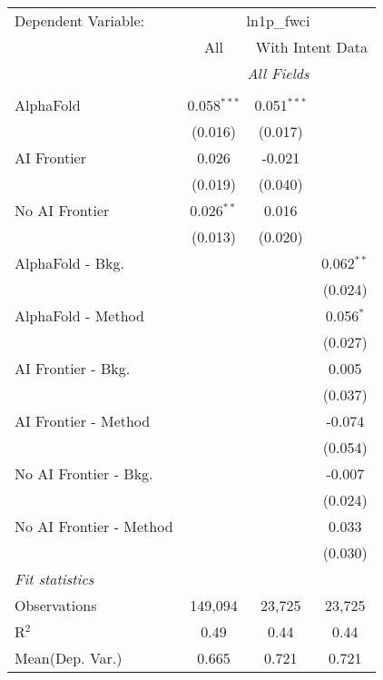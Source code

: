 \begingroup
\centering
\begin{tabular}{lccc}
   \tabularnewline \midrule \midrule
   Dependent Variable: & \multicolumn{3}{c}{ln1p\_fwci}\\
 & \multicolumn{1}{c}{All} & \multicolumn{2}{c}{With Intent Data} \\
\cmidrule(lr){2-2} \cmidrule(lr){3-4}
 & \multicolumn{3}{c}{\textit{All Fields}} \\ \\
   AlphaFold               & 0.058$^{***}$ & 0.051$^{***}$ &   \\   
                           & (0.016)       & (0.017)       &   \\   
   AI Frontier             & 0.026         & -0.021        &   \\   
                           & (0.019)       & (0.040)       &   \\   
   No AI Frontier          & 0.026$^{**}$  & 0.016         &   \\   
                           & (0.013)       & (0.020)       &   \\   
   AlphaFold - Bkg.        &               &               & 0.062$^{**}$\\   
                           &               &               & (0.024)\\   
   AlphaFold - Method      &               &               & 0.056$^{*}$\\   
                           &               &               & (0.027)\\   
   AI Frontier - Bkg.      &               &               & 0.005\\   
                           &               &               & (0.037)\\   
   AI Frontier - Method    &               &               & -0.074\\   
                           &               &               & (0.054)\\   
   No AI Frontier - Bkg.   &               &               & -0.007\\   
                           &               &               & (0.024)\\   
   No AI Frontier - Method &               &               & 0.033\\   
                           &               &               & (0.030)\\   
   \midrule
   \emph{Fit statistics}\\
   Observations            & 149,094       & 23,725        & 23,725\\  
   R$^2$                   & 0.49          & 0.44          & 0.44\\  
Mean(Dep. Var.) & 0.665 & 0.721 & 0.721 \\
   

\end{tabular}
